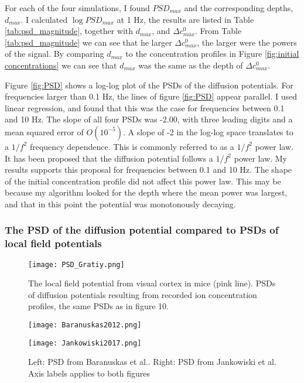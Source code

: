 \documentclass{article}
\begin{document}
For each of the four simulations, I found $PSD_{max}$ and the corresponding depths, $d_{max}$. I calculated $\log PSD_{max}$ at 1 Hz, the results are listed in Table \ref{tab:psd_magnitude}, together with $d_{max}$, and $\Delta c^0_{max}$. From Table  \ref{tab:psd_magnitude} we can see that he larger  $\Delta c^0_{max}$, the larger were the powers of the signal. By comparing $d_{max}$ to the concentration profiles in Figure \ref{fig:initial concentrations} we can see that $d_{max}$ was the same as the depth of $\Delta c^0_{max}$.




Figure \ref{fig:PSD} shows a log-log plot of the PSDs of the diffusion potentials.  For frequencies larger than 0.1 Hz, the lines of figure \ref{fig:PSD} appear parallel. I used linear regression, and found that this was the case for frequencies between 0.1 and 10 Hz. The slope of all four PSDs was -2.00, with three leading digits and a mean squared error of $O(10^{-5})$. A slope of -2 in the log-log space translates to a $1/f^2$ frequency dependence. This is commonly referred to as a $1/f^2$ power law. It has been proposed that the diffusion potential follows a $1/f^2$ power law\cite{Halnes2016}. My results supports this proposal for frequencies between 0.1 and 10 Hz. The shape of the initial concentration profile did not affect this power law. This may be because my algorithm looked for the depth where the mean power was largest, and that in this point the potential was monotonously decaying. 


\subsubsection{The PSD of the diffusion potential compared to PSDs of local field potentials}

\begin{figure}
  \texttt{[image: PSD\_Gratiy.png]}
  \caption{The local field potential from visual cortex in mice (pink line). PSDs of diffusion potentials resulting from recorded ion concentration profiles, the same PSDs as in figure 10.}
  \label{fig:PSD_Gratiy}
\end{figure}


\begin{figure}
 \centering
   \begin{minipage}[b]{0.45\textwidth}
    \texttt{[image: Baranuskas2012.png]}
  \end{minipage}
     \begin{minipage}[b]{0.5\textwidth}
    \texttt{[image: Jankowiski2017.png]}
  \end{minipage}
  \caption{Left: PSD from Baranuskas et al.. Right: PSD from Jankowiski et al. Axis labels applies to both figures}
  \label{fig:PSD_of_LFP}
\end{figure}
\end{document}
